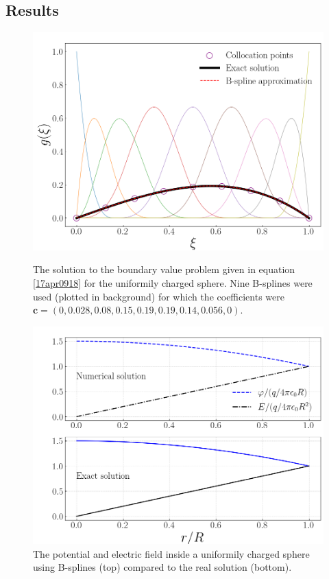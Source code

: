 \documentclass[twocolumn]{article}
\begin{document}
\begin{large}
\subsection*{Results}
\begin{figure}[b!]
    \includegraphics[scale=0.35]{Uniform_g.png}
    \caption{The solution to the boundary value problem given in equation \eqref{17apr0918} for the uniformily charged sphere. Nine B-splines were used (plotted in background) for which the coefficients were $\mathbf{c} = (0,0.028,0.08,0.15,0.19,0.19,0.14,0.056,0)$.}
    \label{17apr0917}
    \includegraphics[scale=0.35]{Uniform_EPhi.png}
    \caption{The potential and electric field inside a uniformily charged sphere using B-splines (top) compared to the real solution (bottom).}

\end{figure}
\end{large}
\end{document}
